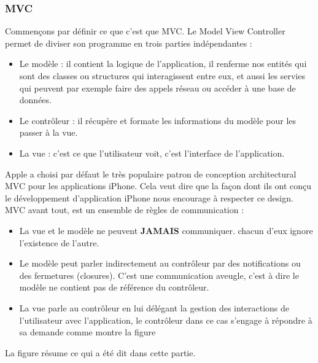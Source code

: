 \subsubsection{MVC} %
 \label{ssub:mvc}
 Commençons par définir ce que c'est que MVC. Le Model View Controller permet de diviser son programme en trois parties indépendantes :
 \begin{itemize}
 	\item Le modèle : il contient la logique de l'application, il renferme nos entités qui sont des classes ou structures qui interagissent entre eux, et aussi les servies qui peuvent par exemple faire des appels réseau ou accéder à une base de données.
 	\item Le contrôleur : il récupère  et formate les informations du modèle pour les passer à la vue.
 	\item La vue : c'est ce que l'utilisateur voit, c'est l'interface de l'application.
 \end{itemize}
 Apple a choisi par défaut le très populaire patron de conception architectural MVC pour les applications iPhone\cite{mvc}. Cela veut dire que la façon dont ils ont conçu le développement d'application iPhone nous encourage à respecter ce design. \newline
 MVC avant tout, est un ensemble de règles de communication :
 \begin{itemize}
 	\item La vue et le modèle ne peuvent \textbf{JAMAIS} communiquer. chacun d'eux ignore l’existence de l'autre.
 	\item Le modèle peut parler indirectement au contrôleur par des notifications ou des fermetures (closures). C'est une communication aveugle, c'est à dire le modèle ne contient pas de référence du contrôleur.
 	\item La vue parle au contrôleur en lui délégant la gestion des interactions de l'utilisateur avec l'application, le contrôleur dans ce cas s'engage à répondre à sa demande comme montre la figure 
 	\newline
 \end{itemize}
 La figure résume ce qui a été dit dans cette partie.


